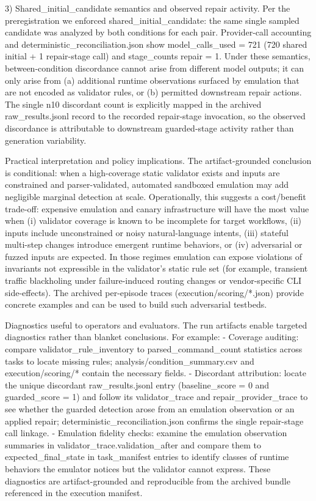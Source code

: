 \documentclass[conference]{IEEEtran}
\begin{document}
3) Shared\_initial\_candidate semantics and observed repair activity. Per the preregistration we enforced shared\_initial\_candidate: the same single sampled candidate was analyzed by both conditions for each pair. Provider-call accounting and deterministic\_reconciliation.json show model\_calls\_used = 721 (720 shared initial + 1 repair-stage call) and stage\_counts repair = 1. Under these semantics, between-condition discordance cannot arise from different model outputs; it can only arise from (a) additional runtime observations surfaced by emulation that are not encoded as validator rules, or (b) permitted downstream repair actions. The single n10 discordant count is explicitly mapped in the archived raw\_results.jsonl record to the recorded repair-stage invocation, so the observed discordance is attributable to downstream guarded-stage activity rather than generation variability.

Practical interpretation and policy implications. The artifact-grounded conclusion is conditional: when a high-coverage static validator exists and inputs are constrained and parser-validated, automated sandboxed emulation may add negligible marginal detection at scale. Operationally, this suggests a cost/benefit trade-off: expensive emulation and canary infrastructure will have the most value when (i) validator coverage is known to be incomplete for target workflows, (ii) inputs include unconstrained or noisy natural-language intents, (iii) stateful multi-step changes introduce emergent runtime behaviors, or (iv) adversarial or fuzzed inputs are expected. In those regimes emulation can expose violations of invariants not expressible in the validator's static rule set (for example, transient traffic blackholing under failure-induced routing changes or vendor-specific CLI side-effects). The archived per-episode traces (execution/scoring/*.json) provide concrete examples and can be used to build such adversarial testbeds.

Diagnostics useful to operators and evaluators. The run artifacts enable targeted diagnostics rather than blanket conclusions. For example:
- Coverage auditing: compare validator\_rule\_inventory to parsed\_command\_count statistics across tasks to locate missing rules; analysis/condition\_summary.csv and execution/scoring/* contain the necessary fields.
- Discordant attribution: locate the unique discordant raw\_results.jsonl entry (baseline\_score = 0 and guarded\_score = 1) and follow its validator\_trace and repair\_provider\_trace to see whether the guarded detection arose from an emulation observation or an applied repair; deterministic\_reconciliation.json confirms the single repair-stage call linkage.
- Emulation fidelity checks: examine the emulation observation summaries in validator\_trace.validation\_after and compare them to expected\_final\_state in task\_manifest entries to identify classes of runtime behaviors the emulator notices but the validator cannot express.
These diagnostics are artifact-grounded and reproducible from the archived bundle referenced in the execution manifest.
\end{document}
